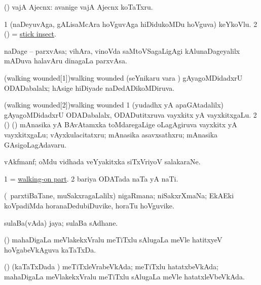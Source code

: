 \bentry
{} 
\gl{\nA}
\expl{}
\bmng
(\AmA) vajA Ajecnx:  avanige vajA Ajecnx koTaTxru. 
\emng
\eentry

\bentry
{} 
\gl{\nA}
\expl{}
\bmng
\bnum
\num{1} (naDeyuvAga, gALisaMcAra hoVguvAga hiDidukoMDu hoVguva) keYkoVlu. 
\num{2} (\ame) = \hyperref{kandict_s.pdf}{S}{stick insect}{stick insect}. 
\enum
\emng
\eentry

\bentry
{} 
\gl{\nA}
\expl{}
\bmng
naDage -- parxvAsa; vihAra, vinoVda saMtoVSagaLigAgi kAlunaDageyalilx mADuva halavAru dinagaLa parxvAsa. 
\emng
\eentry

\bentry
\word(walking wounded[1]){walking wounded}
\gl{\gu}
\expl{}
\bmng
(seYnikaru \mo vara \vi) gAyagoMDidadxrU ODADabalalx; hAsige hiDiyade naDedADikoMDiruva. 
\emng
\eentry

\bentry
\word(walking wounded[2]){walking wounded}
\gl{\nA}
\expl{}
\bmng
\bnum
\num{1} (yudadhx yA apaGAtadalilx) gAyagoMDidadxrU ODADabalalx, ODADutitxruva vayxkitx yA vayxkitxgaLu. 
\num{2} (\AmA) (\kanmu) mAnasika yA BAvAtamxka toMdaregaLige oLagAgiruva vayxkitx yA vayxkitxgaLu; vAyxkulacitatxru; mAnasika asavxsathxru; mAnasika GAsigoLagAdavaru. 
\enum
\emng
\eentry

\bentry
{} 
\gl{\nA}
\bmng
vAkfmanf; oMdu vidhada veYyakitxka siTxVriyoV salakaraNe. 
\emng
\eentry

\bentry
{} 
\gl{\nA}
\expl{}
\bmng
\bnum
\num{1} = \hyperlink{walking-on part}{walking-on part}. 
\num{2} bariya ODATada naTa yA naTi. 
\enum
\emng
\eentry

\bentry
{} 
\gl{\nA}
\expl{}
\bmng
(\kanmu\ parxtiBaTane, muSakxragaLalilx) nigaRmana; niSakxrXmaNa; EkAEki koVpadiMda horanaDedubiDuvike, horaTu hoVguvike. 
\emng
\eentry

\bentry
{} 
\gl{\nA}
\expl{}
\bmng
sulaBa(vAda) jaya; sulaBa sAdhane. 
\emng
\eentry

\bentry
{} 
\gl{\nA}
\expl{}
\bmng
(\ame) mahaDigaLa meVlakekxVralu meTiTxlu sAlugaLa meVle hatitxyeV hoVgabeVkAguva kaTaTxDa. 
\emng
\eentry

\bentry
{} 
\gl{\gu}
\expl{}
\bmng
(\ame) (kaTaTxDada \vi) meTiTxleVrabeVkAda; meTiTxlu hatatxbeVkAda; mahaDigaLa meVlakekxVralu meTiTxlu sAlugaLa meVle hatatxleVbeVkAda. 
\emng
\eentry

